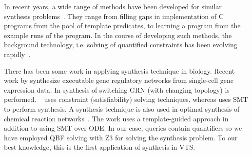 In recent years, a wide range of methods
have been developed for similar synthesis problems~\cite{sketch,sygus,exampleSynth}.
%
They range from filling gaps in implementation of C programs from the pool of template predicates, to learning a program from the example
runs of the program.
%
In the course of developing such methods,
the background technology, i.e. solving of quantified
constraints has been evolving rapidly~\cite{lonsing2010depqbf,z3Quant}.
%

There has been some work in applying synthesis technique in biology. 
%
Recent work by \cite{fisher2015synthesising} synthesize executable gene regulatory networks from single-cell gene expression data.
%
In \cite{shavit2016automated} synthesis of switching GRN (with changing topology) is performed.
%
~\cite{fisher2015synthesising} uses constraint (satisfiability) solving techniques, whereas \cite{shavit2016automated} uses SMT to perform synthesis. 
%
A synthesis technique is also used in optimal synthesis of chemical reaction networks~\cite{cardelli2017syntax}.
%
%
The work uses a template-guided approach in addition to using SMT over ODE. In our case, queries contain quantifiers so we have employed QBF solving with Z3 for solving the synthesis problem. 
%
To our best knowledge, this is the first application of synthesis in VTS.
